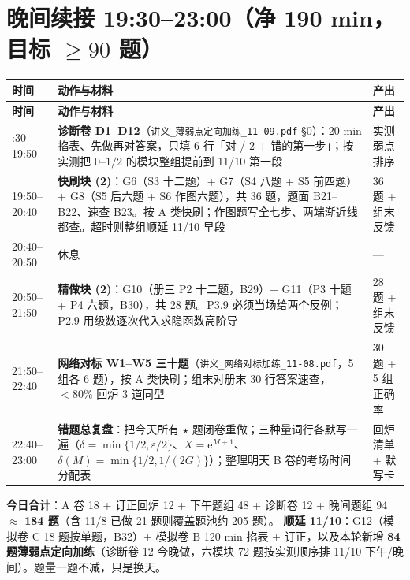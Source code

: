 \documentclass[11pt,a4paper]{ctexart}
\newcommand{\eps}{\varepsilon}
\newcommand{\ee}{\mathrm{e}}
\begin{document}
\section{晚间续接 19:30--23:00（净 190 min，目标 $\geq 90$ 题）}
{\small
\setlength{\tabcolsep}{3pt}
\renewcommand{\arraystretch}{1.06}
\begin{longtable}{@{}p{2.15cm}p{9.55cm}p{3.6cm}@{}}
\toprule
\textbf{时间} & \textbf{动作与材料} & \textbf{产出} \\
\midrule
\endfirsthead
\toprule
\textbf{时间} & \textbf{动作与材料} & \textbf{产出} \\
\midrule
\endhead
\bottomrule
\endlastfoot
19:30--19:50 & \textbf{诊断卷 D1--D12}（\texttt{讲义\_薄弱点定向加练\_11-09.pdf} §0）：20 min 掐表、先做再对答案，只填 6 行「对 / 2 + 错的第一步」；按实测把 $0$--$1/2$ 的模块整组提前到 11/10 第一段 & 实测弱点排序 \\
19:50--20:40 & \textbf{快刷块 (2)}：G6（S3 十二题）+ G7（S4 八题 + S5 前四题）+ G8（S5 后六题 + S6 作图六题），共 36 题，题面 B21--B22、速查 B23。按 A 类快刷；作图题写全七步、两端渐近线都查。超时则整组顺延 11/10 早段 & 36 题 + 组末反馈 \\
20:40--20:50 & 休息 & --- \\
20:50--21:50 & \textbf{精做块 (2)}：G10（册三 P2 十二题，B29）+ G11（P3 十题 + P4 六题，B30），共 28 题。P3.9 必须当场给两个反例；P2.9 用级数逐次代入求隐函数高阶导 & 28 题 + 组末反馈 \\
21:50--22:40 & \textbf{网络对标 W1--W5 三十题}（\texttt{讲义\_网络对标加练\_11-08.pdf}，5 组各 6 题），按 A 类快刷；组末对册末 30 行答案速查，$<80\%$ 回炉 3 道同型 & 30 题 + 5 组正确率 \\
22:40--23:00 & \textbf{错题总复盘}：把今天所有 $\star$ 题闭卷重做；三种量词行各默写一遍（$\delta=\min\{1/2,\eps/2\}$、$X=\ee^{M+1}$、$\delta(M)=\min\{1/2,1/(2G)\}$）；整理明天 B 卷的考场时间分配表 & 回炉清单 + 默写卡 \\
\end{longtable}
}

\noindent\textbf{今日合计}：A 卷 18 + 订正回炉 12 + 下午题组 48 + 诊断卷 12 + 晚间题组 94 $\approx$ \textbf{184 题}（含 11/8 已做 21 题则覆盖题池约 205 题）。
\textbf{顺延 11/10}：G12（模拟卷 C 18 题按单题，B32）+ 模拟卷 B 120 min 掐表 + 订正，以及本轮新增 \textbf{84 题薄弱点定向加练}（诊断卷 12 今晚做，六模块 72 题按实测顺序排 11/10 下午/晚间）。题量一题不减，只是换天。
\end{document}
